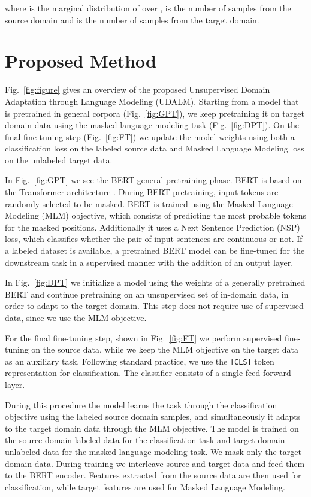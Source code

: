 \documentclass[11pt]{article}
\begin{document}
where  is the marginal distribution of  over ,  is the number of samples from the source domain and  is the number of samples from the target domain.

\section{Proposed Method}
\label{sec:proposed}

Fig.~\ref{fig:figure} gives an overview of the proposed Unsupervised Domain Adaptation through Language Modeling (UDALM). Starting from a model that is pretrained in general corpora (Fig.~\ref{fig:GPT}), we keep pretraining it on target domain data using the masked language modeling task (Fig.~\ref{fig:DPT}). On the final fine-tuning step (Fig.~\ref{fig:FT}) we update the model weights using both a classification loss on the labeled source data and Masked Language Modeling loss on the unlabeled target data.

In Fig.~\ref{fig:GPT} we see the BERT general pretraining phase. BERT \citep{devlin-etal-2019-bert} is based on the Transformer architecture \cite{vaswani2017attention}. 
During BERT pretraining, input tokens are randomly selected to be masked. 
BERT is trained using the Masked Language Modeling (MLM) objective, which consists of predicting the most probable tokens for the masked positions. 
Additionally it uses a Next Sentence Prediction (NSP) loss, which classifies whether the pair of input sentences are continuous or not.
If a labeled dataset is available, a pretrained BERT model can be fine-tuned for the downstream task in a supervised manner with the addition of an output layer. 

In Fig.~\ref{fig:DPT} we initialize a model using the weights of a generally pretrained BERT and continue pretraining on an unsupervised set of in-domain data, in order to adapt to the target domain. This step does not require use of supervised data, since we use the MLM objective.

For the final fine-tuning step, shown in Fig.~\ref{fig:FT} we perform supervised fine-tuning on the source data, while we keep the MLM objective on the target data as an auxiliary task.
Following standard practice, we use the \texttt{[CLS]} token representation for classification. The classifier consists of a single feed-forward layer.

During this procedure the model learns the task through the classification objective using the labeled source domain samples, and simultaneously it adapts to the target domain data through the MLM objective.
The model is trained on the source domain labeled data for the classification task and target domain unlabeled data for the masked language modeling task. We mask only the target domain data. During training we interleave source and target data and feed them to the BERT encoder. Features extracted from the source data are then used for classification, while target features are used for Masked Language Modeling. 
\end{document}
